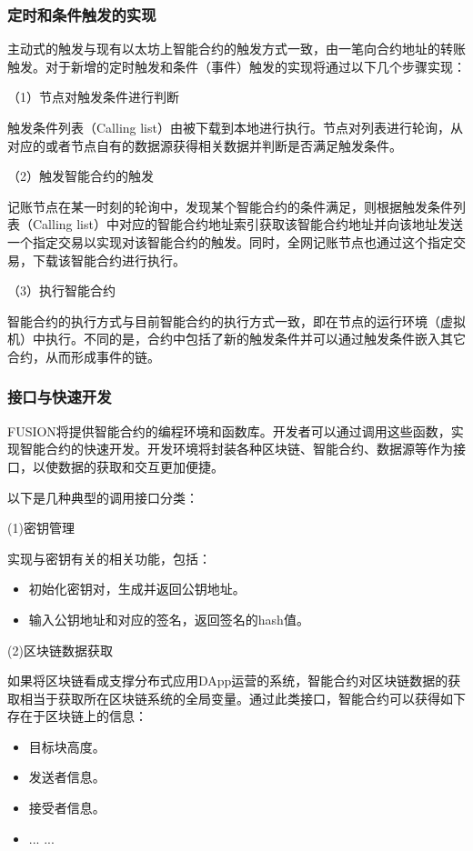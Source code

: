 \documentclass[a4paper,12pt]{article}
\begin{document}
\subsubsection{定时和条件触发的实现}

主动式的触发与现有以太坊上智能合约的触发方式一致，由一笔向合约地址的转账触发。对于新增的定时触发和条件（事件）触发的实现将通过以下几个步骤实现：

（1）节点对触发条件进行判断

触发条件列表（Calling list）由被下载到本地进行执行。节点对列表进行轮询，从对应的或者节点自有的数据源获得相关数据并判断是否满足触发条件。

（2）触发智能合约的触发

记账节点在某一时刻的轮询中，发现某个智能合约的条件满足，则根据触发条件列表（Calling list）中对应的智能合约地址索引获取该智能合约地址并向该地址发送一个指定交易以实现对该智能合约的触发。同时，全网记账节点也通过这个指定交易，下载该智能合约进行执行。

（3）执行智能合约

智能合约的执行方式与目前智能合约的执行方式一致，即在节点的运行环境（虚拟机）中执行。不同的是，合约中包括了新的触发条件并可以通过触发条件嵌入其它合约，从而形成事件的链。
	
\subsubsection{接口与快速开发}

FUSION将提供智能合约的编程环境和函数库。开发者可以通过调用这些函数，实现智能合约的快速开发。开发环境将封装各种区块链、智能合约、数据源等作为接口，以使数据的获取和交互更加便捷。

以下是几种典型的调用接口分类：

(1)密钥管理

实现与密钥有关的相关功能，包括：

\begin{itemize}[itemindent=1em]
	\item 初始化密钥对，生成并返回公钥地址。
	\item 输入公钥地址和对应的签名，返回签名的hash值。
\end{itemize}

(2)区块链数据获取

如果将区块链看成支撑分布式应用DApp运营的系统，智能合约对区块链数据的获取相当于获取所在区块链系统的全局变量。通过此类接口，智能合约可以获得如下存在于区块链上的信息：

\begin{itemize}[itemindent=1em]
	\item 目标块高度。
	\item 发送者信息。
	\item 接受者信息。
	\item ... ...
\end{itemize}
\end{document}

